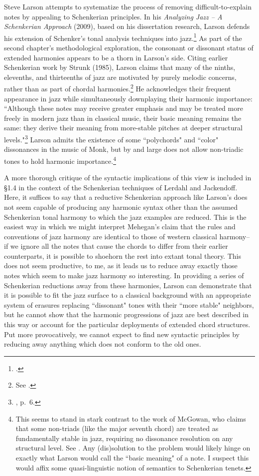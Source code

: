 Steve Larson attempts to systematize the process of removing difficult-to-explain notes by appealing to Schenkerian principles.  In his \emph{Analyzing Jazz -- A Schenkerian Approach} (2009), based on his dissertation research, Larson defends his extension of Schenker's tonal analysis techniques into jazz.\footnote{\cite{larson2009}.}  As part of the second chapter's methodological exploration, the consonant or dissonant status of extended harmonies appears to be a thorn in Larson's side.  Citing earlier Schenkerian work by Strunk (1985), Larson claims that many of the ninths, elevenths, and thirteenths of jazz are motivated by purely melodic concerns, rather than as part of chordal harmonies.\footnote{See \cite{strunk1985}.}  He acknowledges their frequent appearance in jazz while simultaneously downplaying their harmonic importance: ``Although these notes may receive greater emphasis and may be treated more freely in modern jazz than in classical music, their basic meaning remains the same: they derive their meaning from more-stable pitches at deeper structural levels."\footnote{\cite{larson2009}, p.\ 6.}  Larson admits the existence of some ``polychords" and ``color" dissonances in the music of Monk, but by and large does not allow non-triadic tones to hold harmonic importance.\footnote{This seems to stand in stark contrast to the work of McGowan, who claims that some non-triads (like the major seventh chord) are treated as fundamentally stable in jazz, requiring no dissonance resolution on any structural level.  See \cite{mcgowan2008}.  Any (dis)solution to the problem would likely hinge on exactly what Larson would call the ``basic meaning" of a note.  I suspect this would affix some quasi-linguistic notion of semantics to Schenkerian tenets.}

A more thorough critique of the syntactic implications of this view is included in \S 1.4 in the context of the Schenkerian techniques of Lerdahl and Jackendoff.  Here, it suffices to say that a reductive Schenkerian approach like Larson's does not seem capable of producing any harmonic syntax other than the assumed Schenkerian tonal harmony to which the jazz examples are reduced.  This is the easiest way in which we might interpret Mehegan's claim that the rules and conventions of jazz harmony are identical to those of western classical harmony-- if we ignore all the notes that cause the chords to differ from their earlier counterparts, it is possible to shoehorn the rest into extant tonal theory.  This does not seem productive, to me, as it leads us to reduce away exactly those notes which seem to make jazz harmony so interesting.  In providing a series of Schenkerian reductions away from these harmonies, Larson can demonstrate that it is possible to fit the jazz surface to a classical background with an appropriate system of erasures replacing ``dissonant" tones with their ``more stable" neighbors, but he cannot show that the harmonic progressions of jazz are best described in this way or account for the particular deployments of extended chord structures.  Put more provocatively, we cannot expect to find new syntactic principles by reducing away anything which does not conform to the old ones.

